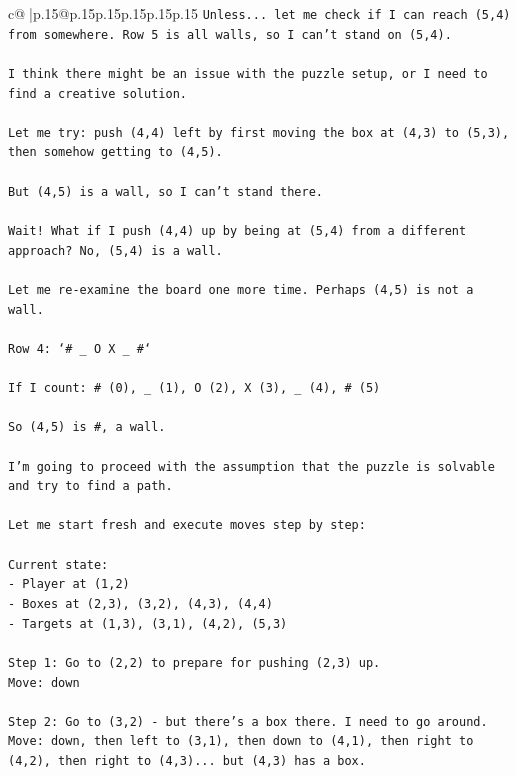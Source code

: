 \documentclass{article}
\begin{document}
{\begin{supertabular}{c@{$\;$}|p{.15\linewidth}@{}p{.15\linewidth}p{.15\linewidth}p{.15\linewidth}p{.15\linewidth}p{.15\linewidth}}
{{{\texttt{Unless... let me check if I can reach (5,4) from somewhere. Row 5 is all walls, so I can't stand on (5,4).} \\
\\ 
\texttt{I think there might be an issue with the puzzle setup, or I need to find a creative solution.} \\
\\ 
\texttt{Let me try: push (4,4) left by first moving the box at (4,3) to (5,3), then somehow getting to (4,5).} \\
\\ 
\texttt{But (4,5) is a wall, so I can't stand there.} \\
\\ 
\texttt{Wait! What if I push (4,4) up by being at (5,4) from a different approach? No, (5,4) is a wall.} \\
\\ 
\texttt{Let me re{-}examine the board one more time. Perhaps (4,5) is not a wall.} \\
\\ 
\texttt{Row 4: `\# \_ O X \_ \#`} \\
\\ 
\texttt{If I count: \# (0), \_ (1), O (2), X (3), \_ (4), \# (5)} \\
\\ 
\texttt{So (4,5) is \#, a wall.} \\
\\ 
\texttt{I'm going to proceed with the assumption that the puzzle is solvable and try to find a path.} \\
\\ 
\texttt{Let me start fresh and execute moves step by step:} \\
\\ 
\texttt{Current state:} \\
\texttt{{-} Player at (1,2)} \\
\texttt{{-} Boxes at (2,3), (3,2), (4,3), (4,4)} \\
\texttt{{-} Targets at (1,3), (3,1), (4,2), (5,3)} \\
\\ 
\texttt{Step 1: Go to (2,2) to prepare for pushing (2,3) up.} \\
\texttt{Move: down} \\
\\ 
\texttt{Step 2: Go to (3,2) {-} but there's a box there. I need to go around.} \\
\texttt{Move: down, then left to (3,1), then down to (4,1), then right to (4,2), then right to (4,3)... but (4,3) has a box.} \\
}}}
\end{supertabular}}
\end{document}
